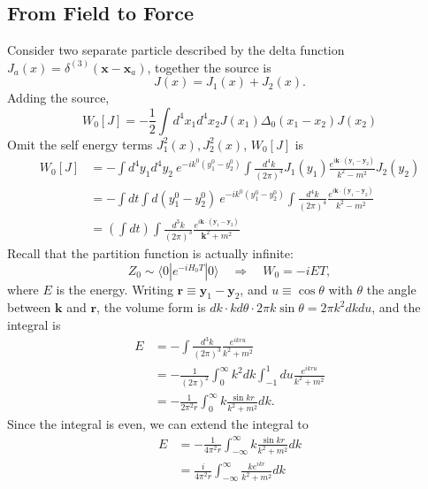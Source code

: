 \documentclass[aps,prb,superscriptaddress,nofootinbib]{revtex4}
\begin{document}
\subsection{From Field to Force}
Consider two separate particle described by the delta function $J_a(x) = \delta^{(3)}(\bm x - \bm x_a)$, together the source is
\begin{equation}
	J(x) = J_1(x) + J_2(x).
\end{equation}
Adding the source,
\begin{equation*}
	W_0[J] = -\frac{1}{2}\int d^4x_1 d^4 x_2 J(x_1) \Delta_0(x_1-x_2) J(x_2)
\end{equation*}
Omit the self energy terms $J_1^2(x), J_2^2(x)$, $W_0[J]$ is
\begin{equation}
\begin{aligned}
	W_0[J] &= -\int d^4 y_1 d^4 y_2\ e^{-ik^0(y_1^0-y_2^0)}\int \frac{d^4 k}{(2\pi)^4} J_1(y_1)\frac{e^{i\bm k\cdot (\bm y_1-\bm y_2)}}{k^2-m^2} J_2(y_2) \\
	&= -\int  dt \int d (y_1^0 - y_2^0) \ e^{-ik^0(y_1^0-y_2^0)}\int \frac{d^4 k}{(2\pi)^4} \frac{e^{i\bm k\cdot (\bm y_1-\bm y_2)}}{k^2-m^2} \\
	&= \left(\int dt \right)\int \frac{d^3 k}{(2\pi)^3} \frac{e^{i\bm k\cdot (\bm y_1-\bm y_2)}}{\bm k^2 + m^2}
\end{aligned}
\end{equation}
Recall that the partition function is actually infinite:
\begin{equation}
	Z_0 \sim \langle 0| e^{-i H_0 T} |0\rangle \quad \Longrightarrow \quad
	W_0 = -i E T,
\end{equation}
where $E$ is the energy.
Writing $\bm r \equiv \bm y_1 - \bm y_2$, and $u \equiv \cos\theta$ with $\theta$ the angle between $\bm k$ and $\bm r$, the volume form is $dk \cdot kd\theta \cdot  2\pi k \sin \theta = 2\pi k^2 dk du$, and the integral is
\begin{equation}
\begin{aligned}
	E &= -\int \frac{d^3 k}{(2\pi)^3} \frac{e^{i k r u}}{k^2 + m^2} \\
	&= - \frac{1}{(2\pi)^2} \int_0^\infty k^2 dk \int_{-1}^1 du \frac{e^{ikru}}{k^2 +m^2} \\
	&= -\frac{1}{2\pi^2 r} \int_0^\infty k  \frac{\sin kr}{k^2 +m^2} dk.
\end{aligned}
\end{equation}
Since the integral is even, we can extend the integral to
\begin{equation}
\begin{aligned}
	E &= -\frac{1}{4\pi^2 r} \int_{-\infty}^\infty k  \frac{\sin kr}{k^2 +m^2} dk \\
	&= \frac{i}{4\pi^2 r} \int_{-\infty}^\infty \frac{k e^{ikr}}{k^2 +m^2} dk
\end{aligned}
\end{equation}
\end{document}
